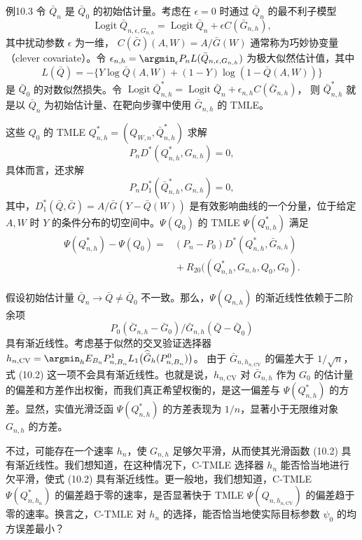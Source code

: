 \begin{bookresult}{例}{10.3}
令 $\bar Q_n$ 是 $\bar Q_0$ 的初始估计量。考虑在 $\epsilon=0$ 时通过 $\bar Q_n$ 的最不利子模型
\[
 \operatorname{Logit}\bar Q_{n,\epsilon,G_{n,h}}
 =\operatorname{Logit}\bar Q_n+\epsilon C(\bar G_{n,h}),
\]
其中扰动参数 $\epsilon$ 为一维，
$C(\bar G)(A,W)=A/\bar G(W)$ 通常称为巧妙协变量（clever covariate）。令
$\epsilon_{n,h}=\argmin_\epsilon P_nL(\bar Q_{n,\epsilon,G_{n,h}})$
为极大似然估计值，其中
\[
 L(\bar Q)
 =-\{Y\log\bar Q(A,W)+(1-Y)\log(1-\bar Q(A,W))\}
\]
是 $\bar Q_0$ 的对数似然损失。令
$\operatorname{Logit}\bar Q_{n,h}^*
 =\operatorname{Logit}\bar Q_n+\epsilon_{n,h}C(\bar G_{n,h})$，
则 $\bar Q_{n,h}^*$ 就是以 $\bar Q_n$ 为初始估计量、在靶向步骤中使用 $\bar G_{n,h}$ 的 TMLE。

这些 $Q_0$ 的 TMLE $Q_{n,h}^*=(Q_{W,n},\bar Q_{n,h}^*)$ 求解
\[
 P_nD^*(Q_{n,h}^*,G_{n,h})=0,
\]
具体而言，还求解
\[
 P_nD_1^*(\bar Q_{n,h}^*,G_{n,h})=0,
\]
其中，$D_1^*(\bar Q,\bar G)=A/\bar G(Y-\bar Q(W))$ 是有效影响曲线的一个分量，位于给定 $A,W$ 时 $Y$ 的条件分布的切空间中。$\Psi(Q_0)$ 的 TMLE $\Psi(Q_{n,h}^*)$ 满足
\[
 \begin{aligned}
 \Psi(Q_{n,h}^*)-\Psi(Q_0)
 ={}&(P_n-P_0)D^*(Q_{n,h}^*,\bar G_{n,h})\\
 &{}+R_{20}((Q_{n,h}^*,G_{n,h},Q_0,G_0).
 \end{aligned}
\]

假设初始估计量 $\bar Q_n\to\bar Q\neq\bar Q_0$ 不一致。那么，$\Psi(Q_{n,h})$ 的渐近线性依赖于二阶余项
\begin{equation}
 P_0(\bar G_{n,h}-\bar G_0)/\bar G_{n,h}(\bar Q-\bar Q_0)
 \tag{10.2}
\end{equation}
具有渐近线性。考虑基于似然的交叉验证选择器
$h_{n,\mathrm{CV}}
 =\argmin_h E_{B_n}P_{n,B_n}^1
 L_1\bigl(\widehat{\bar G}_h(P_{n,B_n}^0)\bigr)$。
由于 $\bar G_{n,h_{n,\mathrm{CV}}}$ 的偏差大于 $1/\sqrt n$，式 (10.2) 这一项不会具有渐近线性。也就是说，$h_{n,\mathrm{CV}}$ 对 $\bar G_{n,h}$ 作为 $G_0$ 的估计量的偏差和方差作出权衡，而我们真正希望权衡的，是这一偏差与 $\Psi(Q_{n,h}^*)$ 的方差。显然，实值光滑泛函 $\Psi(Q_{n,h}^*)$ 的方差表现为 $1/n$，显著小于无限维对象 $G_{n,h}$ 的方差。

不过，可能存在一个速率 $h_n$，使 $G_{n,h}$ 足够欠平滑，从而使其光滑函数 (10.2) 具有渐近线性。我们想知道，在这种情况下，C-TMLE 选择器 $h_n$ 能否恰当地进行欠平滑，使式 (10.2) 具有渐近线性。更一般地，我们想知道，C-TMLE $\Psi(Q_{n,h_n}^*)$ 的偏差趋于零的速率，是否显著快于 TMLE $\Psi(Q_{n,h_{n,\mathrm{CV}}})$ 的偏差趋于零的速率。换言之，C-TMLE 对 $h_n$ 的选择，能否恰当地使实际目标参数 $\psi_0$ 的均方误差最小？
\end{bookresult}


